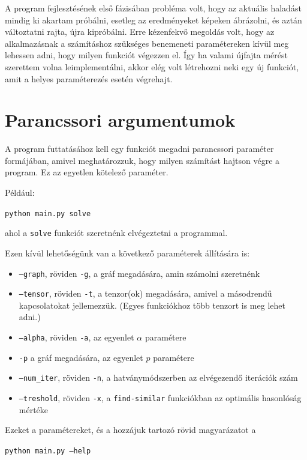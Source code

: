 \documentclass[12pt,numbers=noenddot]{report}
\begin{document}
A program fejlesztésének első fázisában probléma volt, hogy az aktuális haladást
mindig ki akartam próbálni, esetleg az eredményeket képeken ábrázolni, és aztán
változtatni rajta, újra kipróbálni. Erre kézenfekvő megoldás volt, hogy 
az alkalmazásnak a számításhoz szükséges benemeneti paramétereken kívül 
meg lehessen adni, hogy milyen funkciót végezzen el.
Így ha valami újfajta mérést szerettem volna leimplementálni, akkor elég volt
létrehozni neki egy új funkciót, amit a helyes paraméterezés esetén végrehajt.

\section{Parancssori argumentumok}

A program futtatásához kell egy funkciót megadni parancssori paraméter formájában, 
amivel meghatározzuk, hogy milyen számítást hajtson végre a program. 
Ez az egyetlen kötelező paraméter.

\noindent
Például:

\texttt{python main.py solve}

\noindent
ahol a \texttt{solve} funkciót szeretnénk elvégeztetni a programmal.

Ezen kívül lehetőségünk van a következő paraméterek állítására is:

\begin{itemize}
	\item \texttt{--graph}, röviden \texttt{-g}, a gráf megadására, 
		amin számolni szeretnénk
	\item \texttt{--tensor}, röviden \texttt{-t}, a tenzor(ok) megadására, 
		amivel a másodrendű kapcsolatokat jellemezzük. 
		(Egyes funkciókhoz több tenzort is meg lehet adni.)
	\item \texttt{--alpha}, röviden \texttt{-a}, az egyenlet $\alpha$ paramétere
	\item \texttt{-p} a gráf megadására, az egyenlet $p$ paramétere
	\item \texttt{--num\_iter}, röviden \texttt{-n}, a hatványmódszerben az 
		elvégezendő iterációk szám
	\item \texttt{--treshold}, röviden \texttt{-x}, a \texttt{find-similar} 
		funkciókban az optimális hasonlóság mértéke
\end{itemize}

\noindent
Ezeket a paramétereket, és a hozzájuk tartozó rövid magyarázatot a

\texttt{python main.py --help}
\end{document}
